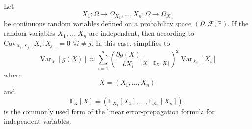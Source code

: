 \begin{remark}
	\label{remark:error_prop_independent}
	Let
	\begin{equation}
		X_1:\Omega \to \Omega_{X_1}, \dots, X_n:\Omega \to \Omega_{X_n}
	\end{equation}
	be continuous random variables defined on a probability space $(\Omega, \mathcal{F}, \mathbb{P})$.	If the random variables $X_1, \dots, X_n$ are independent, then according to  $\mathrm{Cov}_{X_i,X_j}[X_i, X_j] = 0$ $\forall i \neq j$. In this case,  simplifies to
	\begin{equation}
		\operatorname{Var}_{X}[g(X)] \approx \sum_{i=1}^n \left(\frac{\partial g(X)}{\partial X_i}\Big|_{X = \mathbb{E}_X[X]}\right)^2 \operatorname{Var}_{X_i}[X_i]
		\label{eq:error_prop}
	\end{equation}
	where 
	\begin{equation}
		X = (X_1, \dots, X_n)
	\end{equation}
	and
	\begin{equation}
		\mathbb{E}_X[X] = (\mathbb{E}_{X_1}[X_1], \dots, \mathbb{E}_{X_n}[X_n]).
	\end{equation}
	 is the commonly used form of the linear error-propagation formula for independent variables.
\end{remark}

